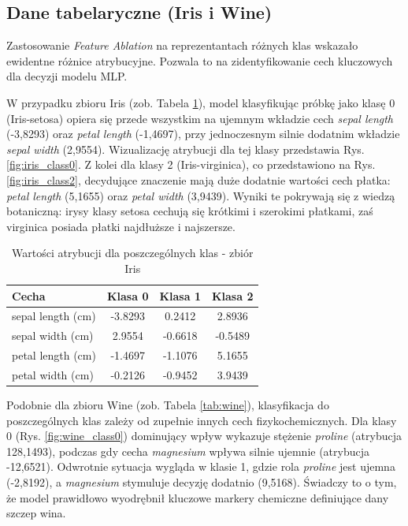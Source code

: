 \documentclass[conference]{IEEEtran}
\begin{document}
\subsection{Dane tabelaryczne (Iris i Wine)}
Zastosowanie \textit{Feature Ablation} na reprezentantach różnych klas wskazało ewidentne różnice atrybucyjne. Pozwala to na zidentyfikowanie cech kluczowych dla decyzji modelu MLP.

W przypadku zbioru Iris (zob. Tabela \ref{tab:iris}), model klasyfikując próbkę jako klasę 0 (Iris-setosa) opiera się przede wszystkim na ujemnym wkładzie cech \textit{sepal length} (-3,8293) oraz \textit{petal length} (-1,4697), przy jednoczesnym silnie dodatnim wkładzie \textit{sepal width} (2,9554). Wizualizację atrybucji dla tej klasy przedstawia Rys. \ref{fig:iris_class0}. Z kolei dla klasy 2 (Iris-virginica), co przedstawiono na Rys. \ref{fig:iris_class2}, decydujące znaczenie mają duże dodatnie wartości cech płatka: \textit{petal length} (5,1655) oraz \textit{petal width} (3,9439). Wyniki te pokrywają się z wiedzą botaniczną: irysy klasy setosa cechują się krótkimi i szerokimi płatkami, zaś virginica posiada płatki najdłuższe i najszersze.

\begin{table}[htbp]
\caption{Wartości atrybucji dla poszczególnych klas - zbiór Iris}
\label{tab:iris}
\begin{center}
\begin{tabular}{|l|c|c|c|}
\hline
\textbf{Cecha} & \textbf{Klasa 0} & \textbf{Klasa 1} & \textbf{Klasa 2} \\
\hline
sepal length (cm) & -3.8293 & 0.2412 & 2.8936 \\
sepal width (cm) & 2.9554 & -0.6618 & -0.5489 \\
petal length (cm) & -1.4697 & -1.1076 & 5.1655 \\
petal width (cm) & -0.2126 & -0.9452 & 3.9439 \\
\hline
\end{tabular}
\end{center}
\end{table}

Podobnie dla zbioru Wine (zob. Tabela \ref{tab:wine}), klasyfikacja do poszczególnych klas zależy od zupełnie innych cech fizykochemicznych. Dla klasy 0 (Rys. \ref{fig:wine_class0}) dominujący wpływ wykazuje stężenie \textit{proline} (atrybucja 128,1493), podczas gdy cecha \textit{magnesium} wpływa silnie ujemnie (atrybucja -12,6521). Odwrotnie sytuacja wygląda w klasie 1, gdzie rola \textit{proline} jest ujemna (-2,8192), a \textit{magnesium} stymuluje decyzję dodatnio (9,5168). Świadczy to o tym, że model prawidłowo wyodrębnił kluczowe markery chemiczne definiujące dany szczep wina.
\end{document}
